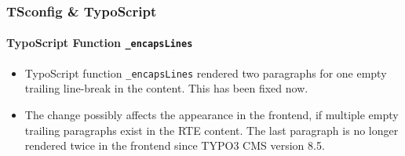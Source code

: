 \begin{frame}[fragile]
	\frametitle{TSconfig \& TypoScript}
	\framesubtitle{TypoScript Function \texttt{\_encapsLines}}

	\begin{itemize}
		\item TypoScript function \texttt{\_encapsLines} rendered two paragraphs for one
			empty trailing line-break in the content. This has been fixed now.

		\item The change possibly affects the appearance in the frontend, if multiple empty trailing
			paragraphs exist in the RTE content. The last paragraph is no longer rendered twice
			in the frontend since TYPO3 CMS version 8.5.

	\end{itemize}

\end{frame}

